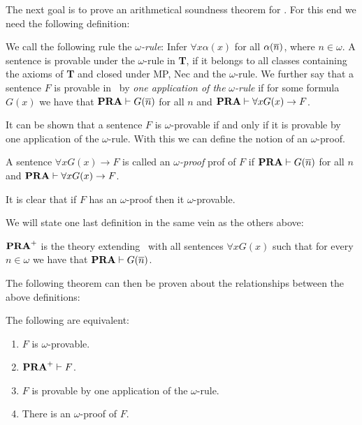 \documentclass[../main.tex]{subfiles}
\begin{document}
The next goal is to prove an arithmetical soundness theorem for \GLB. For this
end we need the following definition:

\begin{defi}
	We call the following rule the  $\omega$\textit{-rule}: Infer $\forall
	x\alpha(x)$ for all $\alpha(\overline n)$, where $n\in\omega$. A sentence is
	provable under the $\omega$-rule in \textbf{T}, if it belongs to all
	classes containing the axioms of \textbf{T} and closed under MP, Nec and
	the $\omega$-rule.
	We further say that a sentence $F$ is provable in \PRA\ by \textit{one
	application of the} $\omega$\textit{-rule} if for some formula $G(x)$
	we have that $\text{\textbf{PRA}}\vdash G(\overline n)$ for all $n$ and $\text{\textbf{PRA}}\vdash \forall
	x G(x)\rightarrow F$.
\end{defi}
It can be shown that  a sentence $F$ is $\omega$-provable if and only if it is provable
by one application of the $\omega$-rule. With this we can define the notion of
an $\omega$-proof.

\begin{defi}
	A sentence $\forall x G(x)\rightarrow F$ is called an
	$\omega$\textit{-proof} prof of $F$ if $\text{\textbf{PRA}}\vdash G(\overline n)$ for all
	$n$ and $\text{\textbf{PRA}}\vdash\forall x G(x)\rightarrow F$.
\end{defi}
It is clear that if $F$ has an $\omega$-proof then it $\omega$-provable.

We will state one last definition in the same vein as the others above:

\begin{defi}
	$\text{\textbf{PRA}}^+$ is the theory extending \PRA\ with all sentences $\forall x
	G(x)$ such that for every $n\in \omega$ we have that $\text{\textbf{PRA}}\vdash G(\overline
	n)$.
\end{defi}

The following theorem can then be proven about the relationships between the
above definitions:

\begin{thm}
	\label{thm:omega}
	The following are equivalent:
	\begin{enumerate}
		\item $F$ is $\omega$-provable.
		\item $\text{\textbf{PRA}}^+\vdash F$.
		\item $F$ is provable by one application of the $\omega$-rule.
		\item There is an $\omega$-proof of $F$.
	\end{enumerate}
\end{thm}
\end{document}
